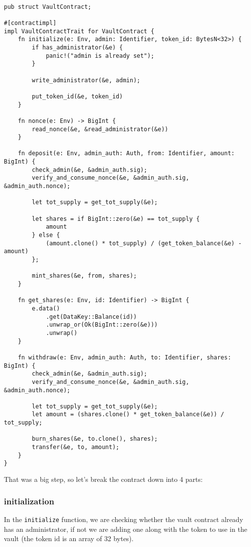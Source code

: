 \documentclass{article}
\newcommand{\inl}[1]{\lstinline{#1}}
\begin{document}
\begin{lstlisting}

pub struct VaultContract;

#[contractimpl]
impl VaultContractTrait for VaultContract {
    fn initialize(e: Env, admin: Identifier, token_id: BytesN<32>) {
        if has_administrator(&e) {
            panic!("admin is already set");
        }

        write_administrator(&e, admin);

        put_token_id(&e, token_id)
    }

    fn nonce(e: Env) -> BigInt {
        read_nonce(&e, &read_administrator(&e))
    }

    fn deposit(e: Env, admin_auth: Auth, from: Identifier, amount: BigInt) {
        check_admin(&e, &admin_auth.sig);
        verify_and_consume_nonce(&e, &admin_auth.sig, &admin_auth.nonce);

        let tot_supply = get_tot_supply(&e);

        let shares = if BigInt::zero(&e) == tot_supply {
            amount
        } else {
            (amount.clone() * tot_supply) / (get_token_balance(&e) - amount)
        };

        mint_shares(&e, from, shares);
    }

    fn get_shares(e: Env, id: Identifier) -> BigInt {
        e.data()
            .get(DataKey::Balance(id))
            .unwrap_or(Ok(BigInt::zero(&e)))
            .unwrap()
    }

    fn withdraw(e: Env, admin_auth: Auth, to: Identifier, shares: BigInt) {
        check_admin(&e, &admin_auth.sig);
        verify_and_consume_nonce(&e, &admin_auth.sig, &admin_auth.nonce);

        let tot_supply = get_tot_supply(&e);
        let amount = (shares.clone() * get_token_balance(&e)) / tot_supply;

        burn_shares(&e, to.clone(), shares);
        transfer(&e, to, amount);
    }
}

\end{lstlisting}

That was a big step, so let's break the contract down into 4 parts:

\subsubsection{initialization}
In the \inl{initialize} function, we are checking whether the vault contract already has an administrator, if not we are adding one along with the token to use in the vault (the token id is an array of 32 bytes).
\end{document}
